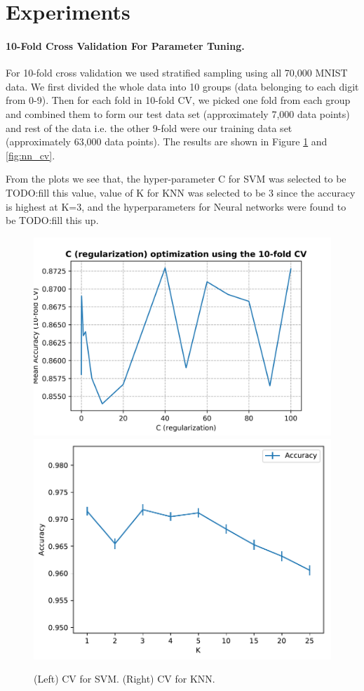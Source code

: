\documentclass[10pt]{scrartcl}
\begin{document}
\section*{Experiments} 
\paragraph{10-Fold Cross Validation For Parameter Tuning.}
For 10-fold cross validation we used stratified sampling using all 70,000 MNIST data. We first divided the whole data into 10 groups (data belonging to each digit from 0-9). Then  for each fold in 10-fold CV, we picked one fold from each group and combined them to form our test data set (approximately 7,000 data points) and rest of the data i.e. the other 9-fold were our training data set (approximately 63,000 data points). The results are shown in Figure \ref{fig:svm_knn_cv} and \ref{fig:nn_cv}.

From the plots we see that, the hyper-parameter C for SVM was selected to be TODO:fill this value, value of K for KNN was selected to be 3 since the accuracy is highest at K=3, and the hyperparameters for Neural networks were found to be TODO:fill this up.

\begin{figure}
\centering
\includegraphics[width=0.5\linewidth]{figures/SVM_regularization_C_mean_acc.png}
\includegraphics[width=0.45\linewidth]{figures/KNN_accuracy_vs_k_with_all_k_values.pdf}
\caption{(Left) CV for SVM. (Right) CV for KNN. \label{fig:svm_knn_cv}}
\end{figure}
\end{document}
